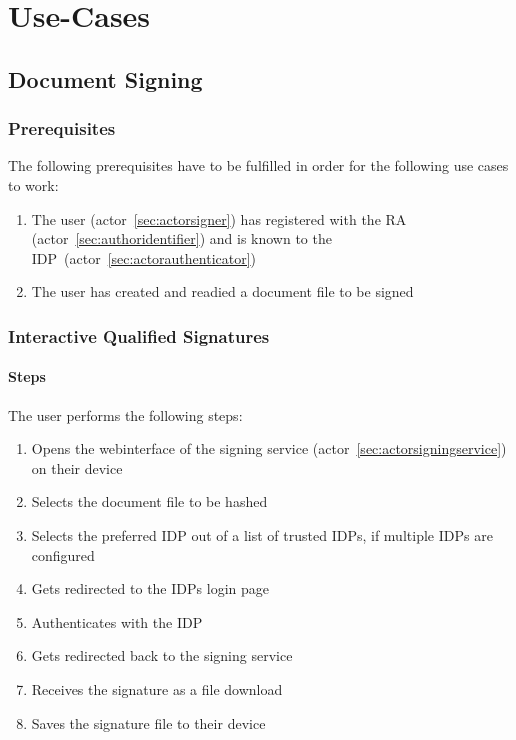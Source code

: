 \chapter{Use-Cases}
\label{ch:usecases}

\section{Document Signing}\label{sec:document-signing}

\subsection{Prerequisites}\label{subsec:prerequisites}
The following prerequisites have to be fulfilled in order for the following use cases to work:
\begin{enumerate}
    \item The user (actor~\ref{sec:actorsigner}) has registered with the \gls{RA} (actor~\ref{sec:authoridentifier}) and is known to the \gls{IDP}~(actor~\ref{sec:actorauthenticator})
    \item The user has created and readied a document file to be signed
\end{enumerate}

\subsection{Interactive Qualified Signatures}\label{subsec:interactive-qualified-signatures}
\subsubsection{Steps}
The user performs the following steps:
\begin{enumerate}
    \item Opens the webinterface of the signing service (actor~\ref{sec:actorsigningservice}) on their device
    \item Selects the document file to be hashed
    \item Selects the preferred \gls{IDP} out of a list of trusted \gls{IDP}s, if multiple \gls{IDP}s are configured
    \item Gets redirected to the \gls{IDP}s login page
    \item Authenticates with the \gls{IDP}
    \item Gets redirected back to the signing service
    \item Receives the signature as a file download
    \item Saves the signature file to their device
\end{enumerate}

